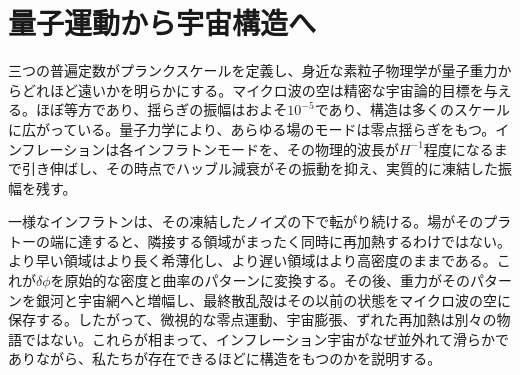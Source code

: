 \section{量子運動から宇宙構造へ}

三つの普遍定数がプランクスケールを定義し、身近な素粒子物理学が量子重力からどれほど遠いかを明らかにする。マイクロ波の空は精密な宇宙論的目標を与える。ほぼ等方であり、揺らぎの振幅はおよそ\(10^{-5}\)であり、構造は多くのスケールに広がっている。量子力学により、あらゆる場のモードは零点揺らぎをもつ。インフレーションは各インフラトンモードを、その物理的波長が\(H^{-1}\)程度になるまで引き伸ばし、その時点でハッブル減衰がその振動を抑え、実質的に凍結した振幅を残す。

一様なインフラトンは、その凍結したノイズの下で転がり続ける。場がそのプラトーの端に達すると、隣接する領域がまったく同時に再加熱するわけではない。より早い領域はより長く希薄化し、より遅い領域はより高密度のままである。これが\(\delta\phi\)を原始的な密度と曲率のパターンに変換する。その後、重力がそのパターンを銀河と宇宙網へと増幅し、最終散乱殻はその以前の状態をマイクロ波の空に保存する。したがって、微視的な零点運動、宇宙膨張、ずれた再加熱は別々の物語ではない。これらが相まって、インフレーション宇宙がなぜ並外れて滑らかでありながら、私たちが存在できるほどに構造をもつのかを説明する。
